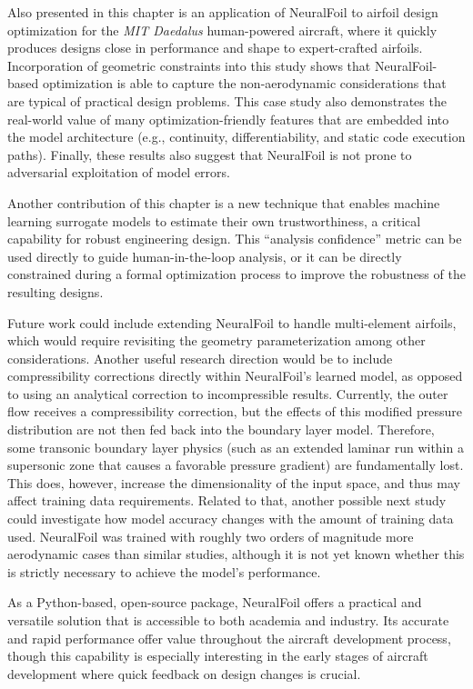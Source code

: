 Also presented in this chapter is an application of NeuralFoil to airfoil design optimization for the \emph{MIT Daedalus} human-powered aircraft, where it quickly produces designs close in performance and shape to expert-crafted airfoils. Incorporation of geometric constraints into this study shows that NeuralFoil-based optimization is able to capture the non-aerodynamic considerations that are typical of practical design problems. This case study also demonstrates the real-world value of many optimization-friendly features that are embedded into the model architecture (e.g., continuity, differentiability, and static code execution paths). Finally, these results also suggest that NeuralFoil is not prone to adversarial exploitation of model errors.

Another contribution of this chapter is a new technique that enables machine learning surrogate models to estimate their own trustworthiness, a critical capability for robust engineering design. This ``analysis confidence'' metric can be used directly to guide human-in-the-loop analysis, or it can be directly constrained during a formal optimization process to improve the robustness of the resulting designs.

Future work could include extending NeuralFoil to handle multi-element airfoils, which would require revisiting the geometry parameterization among other considerations. Another useful research direction would be to include compressibility corrections directly within NeuralFoil's learned model, as opposed to using an analytical correction to incompressible results. Currently, the outer flow receives a compressibility correction, but the effects of this modified pressure distribution are not then fed back into the boundary layer model. Therefore, some transonic boundary layer physics (such as an extended laminar run within a supersonic zone that causes a favorable pressure gradient) are fundamentally lost. This does, however, increase the dimensionality of the input space, and thus may affect training data requirements. Related to that, another possible next study could investigate how model accuracy changes with the amount of training data used. NeuralFoil was trained with roughly two orders of magnitude more aerodynamic cases than similar studies, although it is not yet known whether this is strictly necessary to achieve the model's performance.

As a Python-based, open-source package, NeuralFoil offers a practical and versatile solution that is accessible to both academia and industry. Its accurate and rapid performance offer value throughout the aircraft development process, though this capability is especially interesting in the early stages of aircraft development where quick feedback on design changes is crucial.


